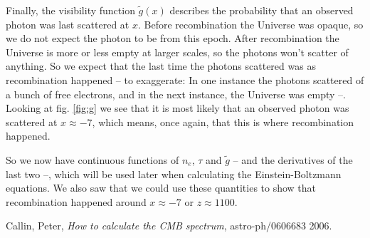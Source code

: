 \documentclass[a4paper,norsk, 10pt]{article}
\begin{document}
Finally, the visibility function $\tilde{g}(x)$ describes the probability that an observed photon was last scattered at $x$. Before recombination the Universe was opaque, so we do not expect the photon to be from this epoch. After recombination the Universe is more or less empty at larger scales, so the photons won't scatter of anything. So we expect that the last time the photons scattered was as recombination happened -- to exaggerate: In one instance the photons scattered of a bunch of free electrons, and in the next instance, the Universe was empty --. Looking at fig. \ref{fig:g} we see that it is most likely that an observed photon was scattered at $x\approx -7$, which means, once again, that this is where recombination happened.

So we now have continuous functions of $n_e$, $\tau$ and $\tilde{g}$ -- and the derivatives of the last two --, which will be used later when calculating the Einstein-Boltzmann equations. We also saw that we could use these quantities to show that recombination happened around $x\approx -7$ or $z \approx 1100$.


\begin{thebibliography}{9}

  Callin, Peter,
  \textit{How to calculate the CMB spectrum},
  astro-ph/0606683
  2006.

\end{thebibliography}
\end{document}
